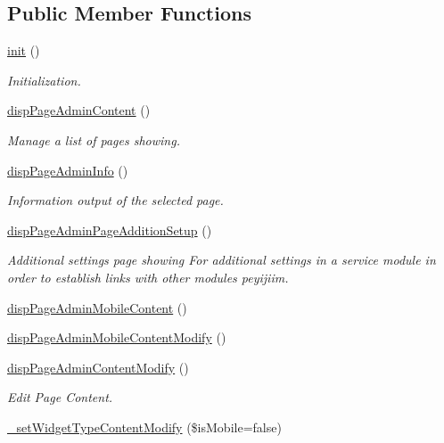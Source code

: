 \subsection*{Public Member Functions}
\begin{DoxyCompactItemize}
\item 
\hyperlink{classpageAdminView_a1b0aaafae4f1de46ba2388457f8ef2cb}{init} ()
\begin{DoxyCompactList}\small\item\em Initialization. \end{DoxyCompactList}\item 
\hyperlink{classpageAdminView_a71a15a59e58bbe4f47af8c051850ad15}{disp\+Page\+Admin\+Content} ()
\begin{DoxyCompactList}\small\item\em Manage a list of pages showing. \end{DoxyCompactList}\item 
\hyperlink{classpageAdminView_aa240ff3b2c7b2befcf4c572916c37ac4}{disp\+Page\+Admin\+Info} ()
\begin{DoxyCompactList}\small\item\em Information output of the selected page. \end{DoxyCompactList}\item 
\hyperlink{classpageAdminView_aad653a82f425e9af960d9ee3998d8662}{disp\+Page\+Admin\+Page\+Addition\+Setup} ()
\begin{DoxyCompactList}\small\item\em Additional settings page showing For additional settings in a service module in order to establish links with other modules peyijiim. \end{DoxyCompactList}\item 
\hyperlink{classpageAdminView_a49a338d91abaf7b5903a06d3c9467b34}{disp\+Page\+Admin\+Mobile\+Content} ()
\item 
\hyperlink{classpageAdminView_a71e87e225509a1c4e761ecc57852c5f5}{disp\+Page\+Admin\+Mobile\+Content\+Modify} ()
\item 
\hyperlink{classpageAdminView_a3396afbab0397643febdf26626c04199}{disp\+Page\+Admin\+Content\+Modify} ()
\begin{DoxyCompactList}\small\item\em Edit Page Content. \end{DoxyCompactList}\item 
\hyperlink{classpageAdminView_a722e1c87ff39044b2ce170f9f7bc5b68}{\+\_\+set\+Widget\+Type\+Content\+Modify} (\$is\+Mobile=false)
\item 

\end{DoxyCompactItemize}
